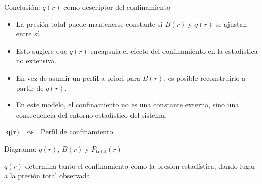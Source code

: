 \documentclass{beamer}
\begin{document}
\begin{frame}{Conclusión: \( q(r) \) como descriptor del confinamiento}
  \begin{itemize}
    \item La presión total puede mantenerse constante si \( B(r) \) y \( q(r) \) se ajustan entre sí.
    \item Esto sugiere que \( q(r) \) encapsula el efecto del confinamiento en la estadística no extensiva.
    \item En vez de asumir un perfil a priori para \( B(r) \), es posible reconstruirlo a partir de \( q(r) \).
    \item En este modelo, el confinamiento no es una constante externa, sino una consecuencia del entorno estadístico del sistema.
  \end{itemize}

  \vspace{0.3cm}
  \centering
  \textbf{\Large \( \boxed{\textbf{q(r)} \quad \leftrightsquigarrow \quad \text{Perfil de confinamiento}} \)}
\end{frame}

\begin{frame}{Diagrama: \( q(r) \), \( B(r) \) y \( P_{\text{total}}(r) \)}
  \centering
  \vspace{0.5cm}
{\footnotesize \( q(r) \) determina tanto el confinamiento como la presión estadística, dando lugar a la presión total observada.}
\end{frame}

\end{document}
